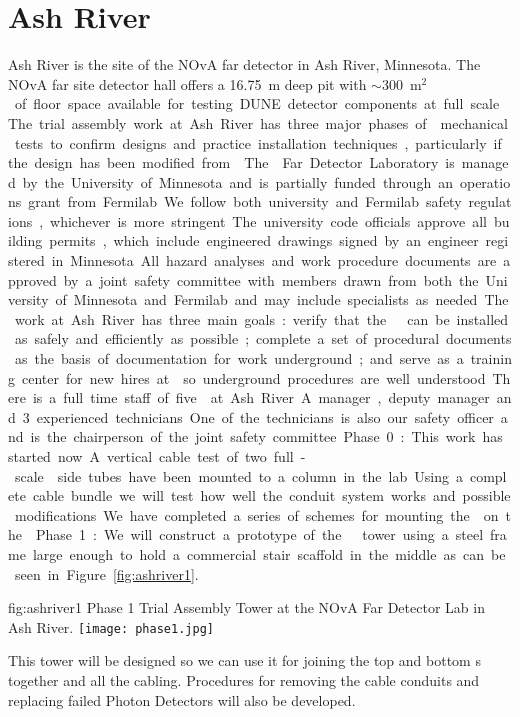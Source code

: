 \section{Ash River}

Ash River is the site of the NOvA far detector in Ash River,
Minnesota. The NOvA far site detector hall offers a \SI{16.75}{m} deep
pit with $\sim$\SI{300}{m$^2$} of floor space available for testing
DUNE detector components at full scale.  The trial assembly work at
Ash River has three major phases of  mechanical tests to
confirm designs and practice installation techniques, particularly if
the design has been modified from .  The 
Far Detector Laboratory is managed by the University of Minnesota and
is partially funded through an operations grant from Fermilab.  We follow both
university and Fermilab safety regulations, whichever is more
stringent.  The university code officials approve all building
permits, which include engineered drawings signed by an engineer
registered in Minnesota. All hazard analyses and work procedure
documents are approved by a joint safety committee with members drawn
from both the University of Minnesota and Fermilab and may include
specialists as needed.

The work at Ash River has three main goals: verify that the
  can be installed as safely and efficiently as
possible; complete a set of procedural documents as the basis of
documentation for work underground; and serve as a training center for
new hires at \surf so underground procedures are well understood.

There is a full time staff of five  at Ash River. A manager,
deputy manager and 3 experienced technicians.  One of the technicians
is also our safety officer and is the chairperson of the joint safety
committee.


Phase 0: This work has started now.  A vertical cable test of two
full-scale  side tubes have been mounted to a column in the
lab. Using a complete cable bundle we will test how well the conduit
system works and possible modifications. We have
completed a series of schemes for mounting the 
on the .

Phase 1: We will construct a prototype of the  
tower using a steel frame large enough to hold a commercial stair
scaffold in the middle as can be seen in Figure ~\ref{fig:ashriver1}.
\begin{dunefigure}{fig:ashriver1}
  {Phase 1 Trial Assembly  Tower at the NOvA Far Detector
    Lab in Ash River.}
  \texttt{[image: phase1.jpg]}
\end{dunefigure}
This  tower will be designed so we can
use it for joining the top and bottom s together and all the
cabling. Procedures for removing the cable conduits and replacing
failed Photon Detectors will also be developed.

